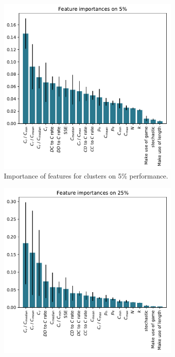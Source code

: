 \documentclass{article}
\begin{document}
\begin{figure}[!htbp]
    \begin{subfigure}[t]{0.5\textwidth}
        \begin{center}
            \includegraphics[width=.75\linewidth]{../new_output/probend_noise/_feature_importance_bar_plot_cluster_on_0_05.pdf}
        \end{center}
        \caption{Importance of features for clusters on 5\% performance.}
    \end{subfigure}
    \begin{subfigure}[t]{0.5\textwidth}
        \begin{center}
            \includegraphics[width=.75\linewidth]{../new_output/probend_noise/_feature_importance_bar_plot_cluster_on_0_25.pdf}

\end{center}
\end{subfigure}
\end{figure}
\end{document}
